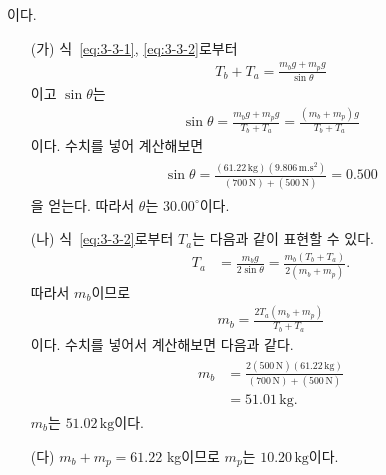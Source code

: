 \documentclass[floatfix,nofootinbib,superscriptaddress,fleqn]{revtex4-2}
\begin{document}
이다.
\begin{itemize}
  \item[(가)]
  식~\eqref{eq:3-3-1}, \eqref{eq:3-3-2}로부터
  \begin{align}
    T_b+T_a = \frac{m_{b}g+m_{p}g}{\sin\theta}
  \end{align}
  이고 $\sin\theta$는
  \begin{align}
    \sin\theta = \frac{m_{b}g+m_{p}g}{T_b+T_a}
    =\frac{(m_b+m_p)g}{T_b+T_a}
  \end{align}
  이다. 수치를 넣어 계산해보면
  \begin{align}
    \begin{split}
      \sin\theta = \frac{(61.22\,\mathrm{kg})
      (9.806\,\mathrm{m.s^2})}
      {(700\,\mathrm{N})+(500\,\mathrm{N})}
      = 0.500
    \end{split}
  \end{align}
  을 얻는다. 따라서 $\theta$는 $30.00^\circ$이다.
  \item[(나)] 
    식~\eqref{eq:3-3-2}로부터 $T_a$는 다음과 같이 표현할 수 있다.
    \begin{align}
      T_a &= \frac{m_{b}g}{2\sin\theta}
      = \frac{m_{b}(T_b+T_a)}{2(m_b+m_p)}.
    \end{align}
    따라서 $m_b$이므로
    \begin{align}
      m_b = \frac{2T_a(m_b+m_p)}{T_b+T_a}
    \end{align}
  이다. 수치를 넣어서 계산해보면 다음과 같다.
  \begin{align}
    \begin{split}
      m_b &= \frac{2(500\,\mathrm{N})(61.22\,\mathrm{kg})}
      {(700\,\mathrm{N})+(500\,\mathrm{N})} \\
      &= 51.01\,\mathrm{kg}.
    \end{split}
  \end{align}
  $m_b$는 $51.02\,\mathrm{kg}$이다.
  \item[(다)]
  $m_b+m_p=61.22$ kg이므로 $m_p$는 $10.20\,\mathrm{kg}$이다.
\end{itemize}

\vspace{1.cm}
\end{document}
